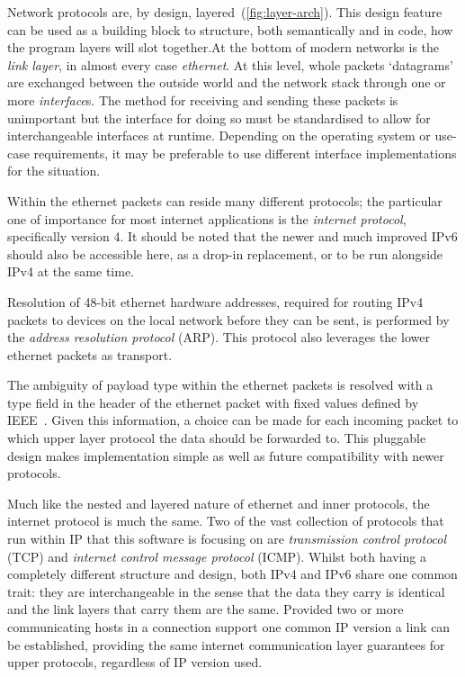         Network protocols are, by design, layered~(\ref{fig:layer-arch}). This design feature can be used as a building block to structure, both semantically and in code, how the program layers will slot together.At the bottom of modern networks is the \emph{link layer}, in almost every case \emph{ethernet}. At this level, whole packets `datagrams' are exchanged between the outside world and the network stack through one or more \emph{interface}s. The method for receiving and sending these packets is unimportant but the interface for doing so must be standardised to allow for interchangeable interfaces at runtime. Depending on the operating system or use-case requirements, it may be preferable to use different interface implementations for the situation. 

        Within the ethernet packets can reside many different protocols; the particular one of importance for most internet applications is the \emph{internet protocol}, specifically version 4. It should be noted that the newer and much improved IPv6 should also be accessible here, as a drop-in replacement, or to be run alongside IPv4 at the same time.

        Resolution of 48-bit ethernet hardware addresses, required for routing IPv4 packets to devices on the local network before they can be sent, is performed by the \emph{address resolution protocol} (ARP). This protocol also leverages the lower ethernet packets as transport.

        The ambiguity of payload type within the ethernet packets is resolved with a type field in the header of the ethernet packet with fixed values defined by IEEE~\cite{ieee-ethertype}. Given this information, a choice can be made for each incoming packet to which upper layer protocol the data should be forwarded to. This pluggable design makes implementation simple as well as future compatibility with newer protocols.

        Much like the nested and layered nature of ethernet and inner protocols, the internet protocol is much the same. Two of the vast collection of protocols that run within IP that this software is focusing on are \emph{transmission control protocol} (TCP) and \emph{internet control message protocol} (ICMP)\@. Whilst both having a completely different structure and design, both IPv4 and IPv6 share one common trait: they are interchangeable in the sense that the data they carry is identical and the link layers that carry them are the same. Provided two or more communicating hosts in a connection support one common IP version a link can be established, providing the same internet communication layer guarantees for upper protocols, regardless of IP version used.

